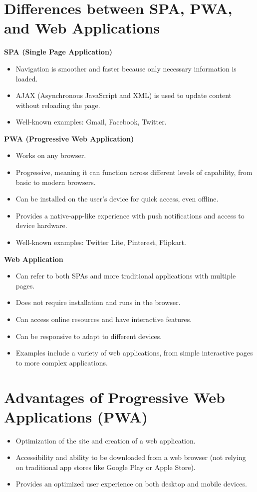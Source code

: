\documentclass{report}
\begin{document}
\section{Differences between SPA, PWA, and Web Applications}

\textbf{SPA (Single Page Application)}
\begin{itemize}
\item Navigation is smoother and faster because only necessary information is loaded.
\item AJAX (Asynchronous JavaScript and XML) is used to update content without reloading the page.
\item Well-known examples: Gmail, Facebook, Twitter.
\end{itemize}

\vspace{12pt}

\textbf{PWA (Progressive Web Application)}
\begin{itemize}
\item Works on any browser.
\item Progressive, meaning it can function across different levels of capability, from basic to modern browsers.
\item Can be installed on the user's device for quick access, even offline.
\item Provides a native-app-like experience with push notifications and access to device hardware.
\item Well-known examples: Twitter Lite, Pinterest, Flipkart.
\end{itemize}

\newpage

\textbf{Web Application}
\begin{itemize}
\item Can refer to both SPAs and more traditional applications with multiple pages.
\item Does not require installation and runs in the browser.
\item Can access online resources and have interactive features.
\item Can be responsive to adapt to different devices.
\item
 Examples include a variety of web applications, from simple interactive pages to more complex applications.
\end{itemize}

\section{Advantages of Progressive Web Applications (PWA)}
\begin{itemize}
\item Optimization of the site and creation of a web application.
\item Accessibility and ability to be downloaded from a web browser (not relying on traditional app stores like Google Play or Apple Store).
\item Provides an optimized user experience on both desktop and mobile devices.
\end{itemize}
\end{document}
